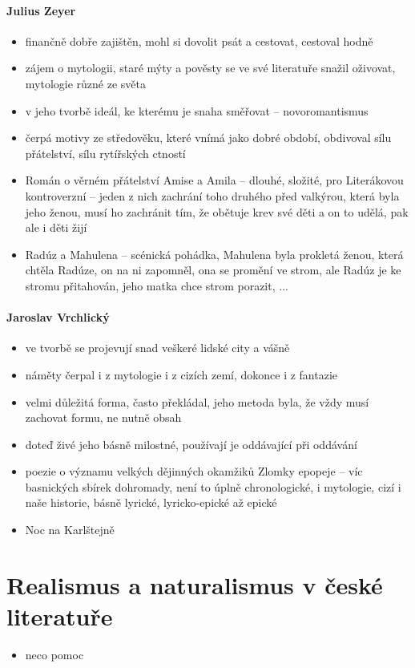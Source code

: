 \documentclass{article}
\begin{document}
\subsection{Julius Zeyer}
\begin{itemize}
  \item finančně dobře zajištěn, mohl si dovolit psát a cestovat, cestoval hodně
  \item zájem o mytologii, staré mýty a pověsty se ve své literatuře snažil oživovat, mytologie různé ze světa
  \item v jeho tvorbě ideál, ke kterému je snaha směřovat -- novoromantismus
  \item čerpá motivy ze středověku, které vnímá jako dobré období, obdivoval sílu přátelství, sílu rytířských ctností
  \item Román o věrném přátelství Amise a Amila -- dlouhé, složité, pro Literákovou kontroverzní -- jeden z nich zachrání toho druhého před valkýrou, která byla jeho ženou, musí ho zachránit tím, že obětuje krev své děti a on to udělá, pak ale i děti žijí
  \item Radúz a Mahulena -- scénická pohádka, Mahulena byla prokletá ženou, která chtěla Radúze, on na ni zapomněl, ona se promění ve strom, ale Radúz je ke stromu přitahován, jeho matka chce strom porazit, ...
\end{itemize}

\subsection{Jaroslav Vrchlický}
\begin{itemize}
  \item ve tvorbě se projevují snad veškeré lidské city a vášně
  \item náměty čerpal i z mytologie i z cizích zemí, dokonce i z fantazie
  \item velmi důležitá forma, často překládal, jeho metoda byla, že vždy musí zachovat formu, ne nutně obsah
  \item doteď živé jeho básně milostné, používají je oddávající při oddávání
  \item poezie o významu velkých dějinných okamžiků Zlomky epopeje -- víc basnických sbírek dohromady, není to úplně chronologické, i mytologie, cizí i naše historie, básně lyrické, lyricko-epické až epické
  \item Noc na Karlštejně
\end{itemize}

\part{Realismus a naturalismus v české literatuře}
\begin{itemize}
  \item neco pomoc
\end{itemize}
\end{document}

